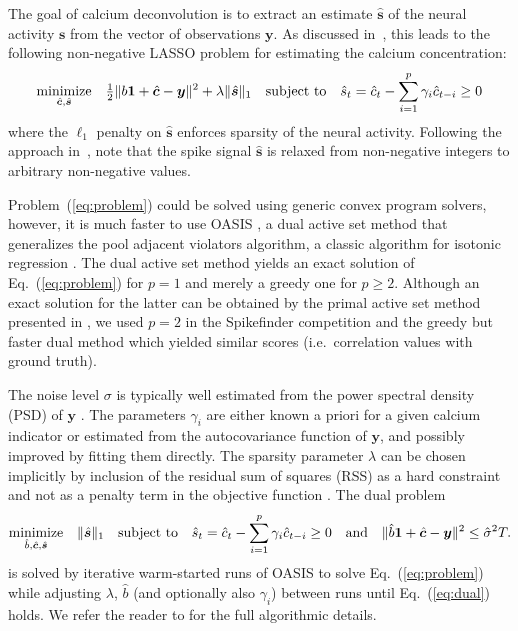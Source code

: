 \documentclass[11pt,a4paper]{article}
\begin{document}
The goal of calcium deconvolution is to extract an estimate $\hat{\bm s}$ of the neural activity $\bm s$ from the vector of observations $\bm y$.
As discussed in~\cite{friedrich2016,vogelstein2010}, this leads to the following non-negative LASSO problem for estimating the calcium concentration:
\begin{equation}
\underset{\hat{\bm c},\hat{\bm s}}{\textrm{minimize}}\quad  \tfrac{1}{2}\|b\bm 1+\hat{\bm c}-\bm y\|^2 + \lambda \|\hat{\bm s}\|_1\quad
\textrm{subject to\quad}  \hat{s}_t=\hat{c}_t-\sum_{i=1}^p \gamma_i \hat{c}_{t-i} \ge 0 \label{eq:problem}
\end{equation}
where the $\ell_1$ penalty on $\hat{\bm s}$ enforces sparsity of the neural activity. Following the approach in~\cite{vogelstein2010}, note that the spike signal $\hat{\bm s}$ is relaxed from non-negative integers to arbitrary non-negative values. 

Problem~(\ref{eq:problem}) could be solved using generic convex program solvers, however, it is much faster to use OASIS \cite{friedrich2016}, a dual active set method that generalizes the pool adjacent violators algorithm, a classic algorithm for isotonic regression \cite{barlow1972}. The dual active set method yields an exact solution of Eq.~(\ref{eq:problem}) for $p=1$ and merely a greedy one for $p\ge2$. Although an exact solution for the latter can be obtained by the primal active set method presented in \cite{friedrich2017}, we used $p=2$ in the Spikefinder competition and the greedy but faster dual method which yielded similar scores (i.e.\ correlation values with ground truth).

The noise level $\sigma$ is typically well estimated from the power spectral density (PSD) of $\bm y$ \cite{pnevmatikakis2016}. The parameters $\gamma_i$ are either known a priori for a given calcium indicator or estimated from the autocovariance function of $\bm y$, and possibly improved by fitting them directly. 
The sparsity parameter $\lambda$ can be chosen implicitly by inclusion of the residual sum of squares (RSS) as a hard constraint and not as a penalty term in the objective function \cite{friedrich2016,pnevmatikakis2016}. The dual problem
\begin{equation}
\underset{\hat{b},\hat{\bm c},\hat{\bm s}}{\textrm{minimize}}\quad  \|\hat{\bm s}\|_1\quad
\textrm{subject to\quad}   \hat{s}_t=\hat{c}_t-\sum_{i=1}^p \gamma_i \hat{c}_{t-i} \ge 0 \quad{\rm and }\quad
\|\hat{b}\bm 1+\hat{\bm c}-\bm y\|^2 \le \hat{\sigma}^2T. \label{eq:dual}
\end{equation}
is solved by iterative warm-started runs of OASIS to solve Eq.~(\ref{eq:problem}) while adjusting $\lambda$, $\hat{b}$ (and optionally also $\gamma_i$) between runs until Eq.~(\ref{eq:dual}) holds. We refer the reader to \cite{friedrich2017} for the full algorithmic details.
\end{document}
